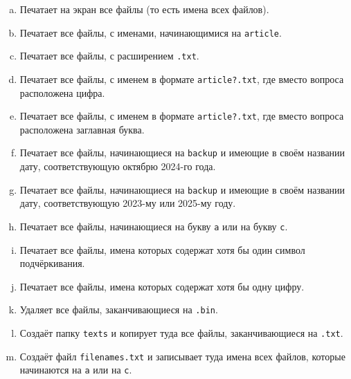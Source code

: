 \documentclass{article}
\begin{document}
\begin{enumerate}[a.]
\item Печатает на экран все файлы (то есть имена всех файлов).
\item Печатает все файлы, с именами, начинающимися на \texttt{article}.
\item Печатает все файлы, с расширением \texttt{.txt}.
\item Печатает все файлы, с именем в формате \texttt{article?.txt}, где вместо вопроса расположена цифра.
\item Печатает все файлы, с именем в формате \texttt{article?.txt}, где вместо вопроса расположена заглавная буква.
\item Печатает все файлы, начинающиеся на \texttt{backup} и имеющие в своём названии дату, соответствующую октябрю 2024-го года.
\item Печатает все файлы, начинающиеся на \texttt{backup} и имеющие в своём названии дату, соответствующую 2023-му или 2025-му году.
\item Печатает все файлы, начинающиеся на букву \texttt{a} или на букву \texttt{c}.
\item Печатает все файлы, имена которых содержат хотя бы один символ подчёркивания.
\item Печатает все файлы, имена которых содержат хотя бы одну цифру.

\item Удаляет все файлы, заканчивающиеся на \texttt{.bin}.
\item Создаёт папку \texttt{texts} и копирует туда все файлы, заканчивающиеся на \texttt{.txt}.
\item Создаёт файл \texttt{filenames.txt} и записывает туда имена всех файлов, которые начинаются на \texttt{a} или на \texttt{c}.
\end{enumerate}
\end{document}
